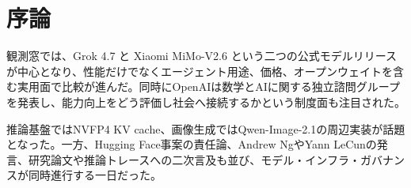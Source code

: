 \section*{序論}
観測窓では、Grok 4.7 と Xiaomi MiMo-V2.6 という二つの公式モデルリリースが中心となり、性能だけでなくエージェント用途、価格、オープンウェイトを含む実用面で比較が進んだ。同時にOpenAIは数学とAIに関する独立諮問グループを発表し、能力向上をどう評価し社会へ接続するかという制度面も注目された。

推論基盤ではNVFP4 KV cache、画像生成ではQwen-Image-2.1の周辺実装が話題となった。一方、Hugging Face事案の責任論、Andrew NgやYann LeCunの発言、研究論文や推論トレースへの二次言及も並び、モデル・インフラ・ガバナンスが同時進行する一日だった。
